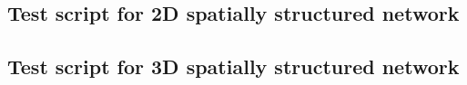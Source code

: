 \begin{landscape}
\titlespacing*{\chapter}{0pt}{-30pt}{7pt}
\titleformat{\chapter}[display]{\normalfont\huge\bfseries}{\chaptertitlename\ \thechapter}{4pt}{\Huge}\chapter{Test script for 2D spatially structured network\label{app:2D}}
\setlength{\columnsep}{0.9cm}
\begin{multicols*}{2}

\end{multicols*}
\end{landscape}
\clearchapter



\begin{landscape}
\titlespacing*{\chapter}{0pt}{-30pt}{7pt}
\titleformat{\chapter}[display]{\normalfont\huge\bfseries}{\chaptertitlename\ \thechapter}{4pt}{\Huge}
\chapter{Test script for 3D spatially structured network\label{app:3D}}
\setlength{\columnsep}{0.9cm}
\begin{multicols*}{2}

\end{multicols*}
\end{landscape}



